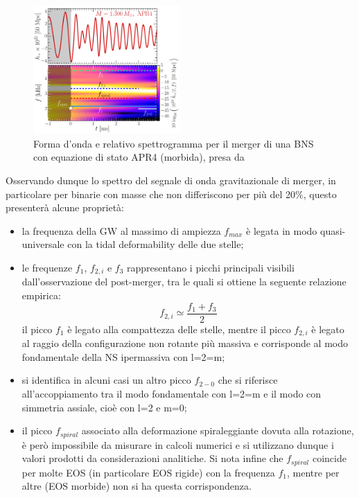 \begin{figure}
	\vspace{-15pt}
	\begin{center}
		\includegraphics[width=0.5\textwidth]{figures/Capitolo_1/GW_spectrogram_short_APR4-q10-M1300.pdf}
	\end{center}
	\vspace{-10pt}
	\caption{Forma d'onda e relativo spettrogramma per il merger di una BNS con equazione di stato APR4 (morbida), presa da \cite{Rezzolla_2016}}
	\label{fig:spettrogramma_merger_APR4}
	\vspace{-25pt}
\end{figure}
Osservando dunque lo spettro del segnale di onda gravitazionale di merger, in particolare per binarie con masse che non differiscono per più del 20\%, questo presenterà alcune proprietà\cite{Rezzolla_2016}:
\begin{itemize}
   	\item la frequenza della GW al massimo di ampiezza $f_{max}$ è legata in modo quasi-universale con la tidal deformability delle due stelle;
   	\item le frequenze $f_1$, $f_{2,i}$ e $f_3$ rappresentano i picchi principali visibili dall'osservazione del post-merger, tra le quali si ottiene la seguente relazione empirica:
   	\begin{equation}
   		f_{2,i}\simeq\frac{f_1 + f_3}{2} 
   		\label{eqn:f1_2_3}
   	\end{equation} 
   	il picco $f_1$ è legato alla compattezza delle stelle, mentre il picco $f_{2,i}$ è legato al raggio della configurazione non rotante più massiva e corrisponde al modo fondamentale della NS ipermassiva con l=2=m;
\end{itemize}

\begin{itemize}
   	\item si identifica in alcuni casi un altro picco $f_{2-0}$ che si riferisce all'accoppiamento tra il modo fondamentale con l=2=m e il modo con simmetria assiale, cioè con l=2 e m=0;
   	\item il picco $f_{spiral}$ associato alla deformazione spiraleggiante dovuta alla rotazione, è però impossibile da misurare in calcoli numerici e si utilizzano dunque i valori prodotti da considerazioni analitiche. Si nota infine che $f_{spiral}$ coincide per molte EOS (in particolare EOS rigide) con la frequenza $f_1$, mentre per altre (EOS morbide) non si ha questa corrispondenza.
\end{itemize}

